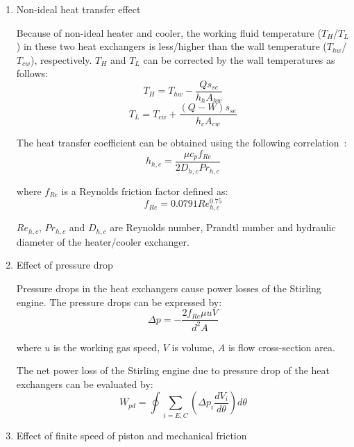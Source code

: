 \begin{enumerate}[label=(\arabic*)]
\item Non-ideal heat transfer effect

Because of non-ideal heater and cooler, the working fluid temperature ($T_{H}$/$T_L$) in these two heat exchangers is less/higher than the wall temperature ($T_{hw}$/$T_{cw}$), respectively. $T_{H}$ and $T_{L}$ can be corrected by the wall temperatures as follows:
\begin{equation}
	T_H = T_{hw} - \frac{Qs_{se}}{h_hA_{hw}}
	\label{eq:T_H}
\end{equation}
\begin{equation}
	T_L = T_{cw} + \frac{(Q-W)s_{se}}{h_cA_{cw}}
	\label{eq:T_L}
\end{equation}

The heat transfer coefficient can be obtained using the following correlation~\cite{Babaelahi2015}:
\begin{equation}
	h_{h,c} = \frac{\mu c_pf_{Re}}{2D_{h,c}Pr_{h,c}}
\end{equation}

where $f_{Re}$ is a Reynolds friction factor defined as:
\begin{equation}
	f_{Re} = 0.0791Re_{h,c}^{0.75}
\end{equation}

$Re_{h,c}$, $Pr_{h,c}$ and $D_{h,c}$ are Reynolds number, Prandtl number and hydraulic diameter of the heater/cooler exchanger.

\item Effect of pressure drop

Pressure drops in the heat exchangers cause power losses of the Stirling engine. The pressure drops can be expressed by:~\cite{Urieli1984}
\begin{equation}
	\Delta p = -\frac{2f_{Re}\mu u V}{d^2A}
\end{equation}

where $u$ is the working gas speed, $V$ is volume, $A$ is flow cross-section area.

The net power loss of the Stirling engine due to pressure drop of the heat exchangers can be evaluated by:
\begin{equation}
	W_{pd} = \oint\underset{i = E,C}{\sum}(\Delta p_{i}\frac{dV_i}{d\theta})d\theta
\end{equation}

\item Effect of finite speed of piston and mechanical friction


\end{enumerate}
